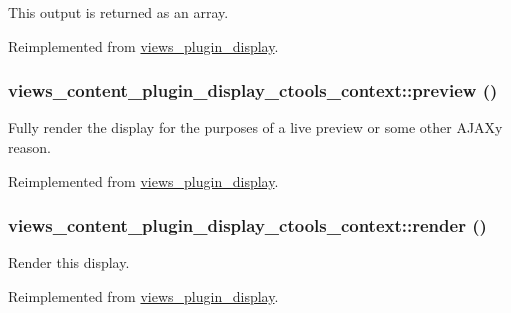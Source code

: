 This output is returned as an array. 

Reimplemented from \hyperlink{classviews__plugin__display_a7a2f2aeedfc14816815e3ce65a61aedf}{views\_\-plugin\_\-display}.\hypertarget{classviews__content__plugin__display__ctools__context_a6e61452a3694e1bf66281b4a7456299a}{
\subsubsection[{preview}]{\setlength{\rightskip}{0pt plus 5cm}views\_\-content\_\-plugin\_\-display\_\-ctools\_\-context::preview ()}}
\label{classviews__content__plugin__display__ctools__context_a6e61452a3694e1bf66281b4a7456299a}
Fully render the display for the purposes of a live preview or some other AJAXy reason. 

Reimplemented from \hyperlink{classviews__plugin__display_a39a392ae163b9d5850559e3cf098e64f}{views\_\-plugin\_\-display}.\hypertarget{classviews__content__plugin__display__ctools__context_a98c81b35153f725da4632087e870b709}{
\subsubsection[{render}]{\setlength{\rightskip}{0pt plus 5cm}views\_\-content\_\-plugin\_\-display\_\-ctools\_\-context::render ()}}
\label{classviews__content__plugin__display__ctools__context_a98c81b35153f725da4632087e870b709}
Render this display. 

Reimplemented from \hyperlink{classviews__plugin__display_acf230a4b44b452c9469f5df92e58e32e}{views\_\-plugin\_\-display}.

